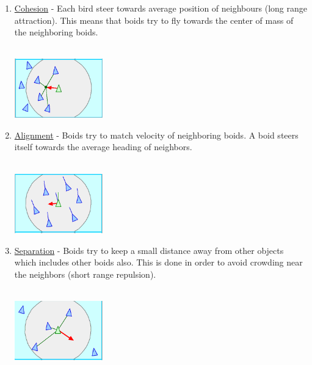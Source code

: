 \documentclass[a4paper]{article}
\begin{document}
\medskip
\begin{enumerate}
\item\underline{Cohesion} -  Each bird steer towards average position of neighbours (long range attraction). This means that boids try to fly towards the center of mass of the neighboring boids.
\\\\
\begin{minipage}{\linewidth}
\centering
\includegraphics[width=0.3\textwidth]{cohesion.PNG}
\end{minipage}


\item\underline{Alignment} -  Boids try to match velocity of neighboring boids. A boid steers itself towards the average heading of neighbors.
\\\\
\begin{minipage}{\linewidth}
\centering
\includegraphics[width=0.3\textwidth]{alignment.PNG}
\end{minipage}
\pagebreak
\item\underline{Separation} -  Boids try to keep a small distance away from other objects which includes other boids also. This is done in order to avoid crowding near the neighbors (short range repulsion).
\\\\
\begin{minipage}{\linewidth}
\centering
\includegraphics[width=0.3\textwidth]{separation.PNG}
\end{minipage}

\end{enumerate}
\end{document}
